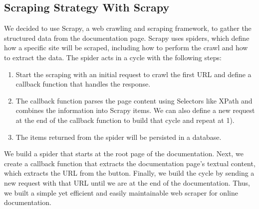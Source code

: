 \subsection{Scraping Strategy With Scrapy}\label{subsec:scrapy}
We decided to use Scrapy, a web crawling and scraping framework, to gather the structured data from the documentation page.
Scrapy uses spiders, which define how a specific site will be scraped, including how to perform the crawl and how to extract the data.
The spider acts in a cycle with the following steps:
\begin{enumerate}
    \item Start the scraping with an initial request to crawl the first \ac{URL} and define a callback function that handles the response.
    \item The callback function parses the page content using Selectors like XPath and combines the information into Scrapy items.
    We can also define a new request at the end of the callback function to build that cycle and repeat at 1).
    \item The items returned from the spider will be persisted in a database.
\end{enumerate}
We build a spider that starts at the root page of the documentation.
Next, we create a callback function that extracts the documentation page's textual content, which extracts the \ac{URL} from the  button.
Finally, we build the cycle by sending a new request with that \ac{URL} until we are at the end of the documentation.
Thus, we built a simple yet efficient and easily maintainable web scraper for online documentation.


